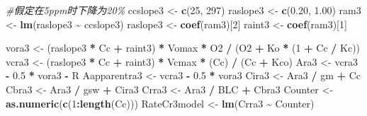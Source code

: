 \documentclass[
]{krantz}
\makeatletter
\newenvironment{Shaded}{\begin{snugshade}}{\end{snugshade}}
\newcommand{\CommentTok}[1]{\textcolor[rgb]{0.56,0.35,0.01}{\textit{#1}}}
\newcommand{\DecValTok}[1]{\textcolor[rgb]{0.00,0.00,0.81}{#1}}
\newcommand{\FloatTok}[1]{\textcolor[rgb]{0.00,0.00,0.81}{#1}}
\newcommand{\KeywordTok}[1]{\textcolor[rgb]{0.13,0.29,0.53}{\textbf{#1}}}
\newcommand{\NormalTok}[1]{#1}
\newcommand{\OperatorTok}[1]{\textcolor[rgb]{0.81,0.36,0.00}{\textbf{#1}}}
\newcommand{\StringTok}[1]{\textcolor[rgb]{0.31,0.60,0.02}{#1}}
\newenvironment{kframe}{%
\medskip{}
\setlength{\fboxsep}{.8em}
 \def\at@end@of@kframe{}%
 \ifinner\ifhmode%
  \def\at@end@of@kframe{\end{minipage}}%
  \begin{minipage}{\columnwidth}%
 \fi\fi%
 \def\FrameCommand##1{\hskip\@totalleftmargin \hskip-\fboxsep
 \colorbox{shadecolor}{##1}\hskip-\fboxsep
     \hskip-\linewidth \hskip-\@totalleftmargin \hskip\columnwidth}%
 \MakeFramed {\advance\hsize-\width
   \@totalleftmargin\z@ \linewidth\hsize
   \@setminipage}}%
 {\par\unskip\endMakeFramed%
 \at@end@of@kframe}
\renewenvironment{Shaded}{\begin{kframe}}{\end{kframe}}
\makeatother
\begin{document}
\begin{Shaded}
\begin{Highlighting}[]
\CommentTok{\#假定在5ppm时下降为20\%}
\NormalTok{ccslope3 \textless{}{-}}\StringTok{ }\KeywordTok{c}\NormalTok{(}\DecValTok{25}\NormalTok{, }\DecValTok{297}\NormalTok{)}
\NormalTok{raslope3 \textless{}{-}}\StringTok{ }\KeywordTok{c}\NormalTok{(}\FloatTok{0.20}\NormalTok{, }\FloatTok{1.00}\NormalTok{)}
\NormalTok{ram3 \textless{}{-}}\StringTok{ }\KeywordTok{lm}\NormalTok{(raslope3 }\OperatorTok{\textasciitilde{}}\StringTok{ }\NormalTok{ccslope3)}
\NormalTok{raslope3 \textless{}{-}}\StringTok{ }\KeywordTok{coef}\NormalTok{(ram3)[}\DecValTok{2}\NormalTok{]}
\NormalTok{raint3 \textless{}{-}}\StringTok{ }\KeywordTok{coef}\NormalTok{(ram3)[}\DecValTok{1}\NormalTok{]}

\NormalTok{vora3 \textless{}{-}}
\StringTok{  }\NormalTok{(raslope3 }\OperatorTok{*}\StringTok{ }\NormalTok{Cc }\OperatorTok{+}\StringTok{ }\NormalTok{raint3) }\OperatorTok{*}\StringTok{ }\NormalTok{Vomax }\OperatorTok{*}\StringTok{ }\NormalTok{O2 }\OperatorTok{/}\StringTok{ }\NormalTok{(O2 }\OperatorTok{+}\StringTok{ }\NormalTok{Ko }\OperatorTok{*}\StringTok{ }\NormalTok{(}\DecValTok{1} \OperatorTok{+}\StringTok{ }\NormalTok{Cc }\OperatorTok{/}\StringTok{ }\NormalTok{Kc)) }
\NormalTok{vcra3 \textless{}{-}}\StringTok{ }\NormalTok{(raslope3 }\OperatorTok{*}\StringTok{ }\NormalTok{Cc }\OperatorTok{+}\StringTok{ }\NormalTok{raint3) }\OperatorTok{*}\StringTok{ }\NormalTok{Vcmax }\OperatorTok{*}\StringTok{ }\NormalTok{(Cc) }\OperatorTok{/}\StringTok{ }\NormalTok{(Cc }\OperatorTok{+}\StringTok{ }\NormalTok{Kco) }
\NormalTok{Ara3 \textless{}{-}}\StringTok{ }\NormalTok{vcra3 }\OperatorTok{{-}}\StringTok{ }\FloatTok{0.5} \OperatorTok{*}\StringTok{ }\NormalTok{vora3 }\OperatorTok{{-}}\StringTok{ }\NormalTok{R }
\NormalTok{Aapparentra3 \textless{}{-}}\StringTok{ }\NormalTok{vcra3 }\OperatorTok{{-}}\StringTok{ }\FloatTok{0.5} \OperatorTok{*}\StringTok{ }\NormalTok{vora3 }
\NormalTok{Cira3 \textless{}{-}}\StringTok{ }\NormalTok{Ara3 }\OperatorTok{/}\StringTok{ }\NormalTok{gm }\OperatorTok{+}\StringTok{ }\NormalTok{Cc }
\NormalTok{Cbra3 \textless{}{-}}\StringTok{ }\NormalTok{Ara3 }\OperatorTok{/}\StringTok{ }\NormalTok{gsw }\OperatorTok{+}\StringTok{ }\NormalTok{Cira3 }
\NormalTok{Crra3 \textless{}{-}}\StringTok{ }\NormalTok{Ara3 }\OperatorTok{/}\StringTok{ }\NormalTok{BLC }\OperatorTok{+}\StringTok{ }\NormalTok{Cbra3 }
\NormalTok{Counter \textless{}{-}}\StringTok{ }\KeywordTok{as.numeric}\NormalTok{(}\KeywordTok{c}\NormalTok{(}\DecValTok{1}\OperatorTok{:}\KeywordTok{length}\NormalTok{(Cc)))}
\NormalTok{RateCr3model \textless{}{-}}\StringTok{ }\KeywordTok{lm}\NormalTok{(Crra3 }\OperatorTok{\textasciitilde{}}\StringTok{ }\NormalTok{Counter)}

\end{Highlighting}
\end{Shaded}
\end{document}
